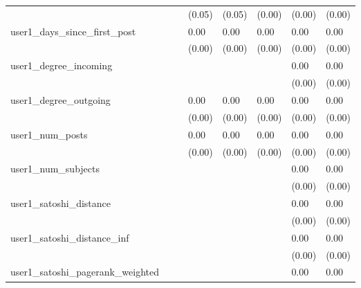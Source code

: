 \begin{table}
\begin{center}
\begin{tabular}{llllllll}
                                               &         &         & (0.05)  & (0.05)  & (0.00)   & (0.00)    & (0.00)   \\
user1_days_since_first_post                    &         &         & 0.00    & 0.00    & 0.00     & 0.00      & 0.00     \\
                                               &         &         & (0.00)  & (0.00)  & (0.00)   & (0.00)    & (0.00)   \\
user1_degree_incoming                          &         &         &         &         &          & 0.00      & 0.00     \\
                                               &         &         &         &         &          & (0.00)    & (0.00)   \\
user1_degree_outgoing                          &         &         & 0.00    & 0.00    & 0.00     & 0.00      & 0.00     \\
                                               &         &         & (0.00)  & (0.00)  & (0.00)   & (0.00)    & (0.00)   \\
user1_num_posts                                &         &         & 0.00    & 0.00    & 0.00     & 0.00      & 0.00     \\
                                               &         &         & (0.00)  & (0.00)  & (0.00)   & (0.00)    & (0.00)   \\
user1_num_subjects                             &         &         &         &         &          & 0.00      & 0.00     \\
                                               &         &         &         &         &          & (0.00)    & (0.00)   \\
user1_satoshi_distance                         &         &         &         &         &          & 0.00      & 0.00     \\
                                               &         &         &         &         &          & (0.00)    & (0.00)   \\
user1_satoshi_distance_inf                     &         &         &         &         &          & 0.00      & 0.00     \\
                                               &         &         &         &         &          & (0.00)    & (0.00)   \\
user1_satoshi_pagerank_weighted                &         &         &         &         &          & 0.00      & 0.00     \\

\end{tabular}
\end{center}
\end{table}

